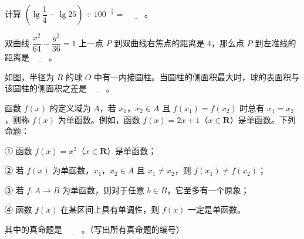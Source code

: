 \begin{question}
计算 $\left(\lg\dfrac14-\lg 25\right)\div 100^{-\frac12}=$ $\underline{\qquad}$。

\end{question}
\begin{question}
双曲线 $\dfrac{x^2}{64}-\dfrac{y^2}{36}=1$ 上一点 $P$ 到双曲线右焦点的距离是 $4$，那么点 $P$ 到左准线的距离是 $\underline{\qquad}$。

\Needspace{0.4\textheight}
\end{question}
\begin{question}
如图，半径为 $R$ 的球 $O$ 中有一内接圆柱。当圆柱的侧面积最大时，球的表面积与该圆柱的侧面积之差是 $\underline{\qquad}$。
\nopagebreak[4]
\begin{center}\end{center}
\nopagebreak[4]
\end{question}
\begin{question}
函数 $f(x)$ 的定义域为 $A$，若 $x_1$，$x_2\in A$ 且 $f(x_1)=f(x_2)$ 时总有 $x_1=x_2$，则称 $f(x)$ 为单函数。例如，函数 $f(x)=2x+1$（$x\in\mathbf R$）是单函数。下列命题：

① 函数 $f(x)=x^2$（$x\in\mathbf R$）是单函数；

② 若 $f(x)$ 为单函数，$x_1$，$x_2\in A$ 且 $x_1\neq x_2$，则 $f(x_1)\neq f(x_2)$；

③ 若 $f\colon A\to B$ 为单函数，则对于任意 $b\in B$，它至多有一个原象；

④ 函数 $f(x)$ 在某区间上具有单调性，则 $f(x)$ 一定是单函数。

其中的真命题是 $\underline{\qquad}$。（写出所有真命题的编号）

\end{question}

